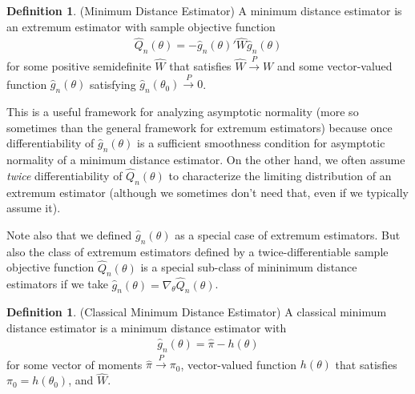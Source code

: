\documentclass[12pt]{article}
\theoremstyle{plain}
\theoremstyle{definition}
\newtheorem{defn}[thm]{Definition}
\theoremstyle{remark}
\newcommand{\pto}{\xrightarrow{P}}
\begin{document}
\begin{defn}(Minimum Distance Estimator)
A minimum distance estimator is an extremum estimator with sample
objective function
\begin{align*}
  \widehat{Q}_n(\theta)
  =
  -
  \widehat{g}_n(\theta)'
  \widehat{W}
  \widehat{g}_n(\theta)
\end{align*}
for some positive semidefinite $\widehat{W}$ that satisfies
$\widehat{W}\pto W$ and some vector-valued function
$\widehat{g}_n(\theta)$ satisfying $\widehat{g}_n(\theta_0)\pto 0$.

This is a useful framework for analyzing asymptotic normality
(more so sometimes than the general framework for extremum estimators)
because once differentiability of $\widehat{g}_n(\theta)$ is a
sufficient smoothness condition for asymptotic normality of a minimum
distance estimator.
On the other hand, we often assume \emph{twice} differentiability of
$\widehat{Q}_n(\theta)$ to characterize the limiting distribution
of an extremum estimator (although we sometimes don't need that, even if
we typically assume it).

Note also that we defined $\widehat{g}_n(\theta)$ as a special case of
extremum estimators.
But also the class of extremum estimators defined by a
twice-differentiable sample objective function $\widehat{Q}_n(\theta)$
is a special sub-class of mininimum distance estimators if we take
$\widehat{g}_n(\theta)=\nabla_\theta \widehat{Q}_n(\theta)$.
\end{defn}


\begin{defn}(Classical Minimum Distance Estimator)
A classical minimum distance estimator is a minimum distance estimator
with
\begin{align*}
  \widehat{g}_n(\theta)
  =
  \hat{\pi}-h(\theta)
\end{align*}
for some vector of moments $\hat{\pi}\pto\pi_0$, vector-valued function
$h(\theta)$ that satisfies $\pi_0=h(\theta_0)$, and $\widehat{W}$.
\end{defn}
\end{document}
